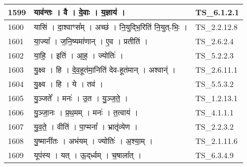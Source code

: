 \documentclass[17pt]{extarticle}
\begin{document}
\begin{longtable}{||p{0.4in}||p{4.9in}||p{0.9in}||}
    \hline
        
    1599 & याव॑न्तः   ।   वै   ।   दे॒वाः   ।   य॒ज्ञाय॑   ।    & TS\_6.1.2.1       \\
    
    \hline
        
    1600 & यासि॑   ।   दा॒श्वाꣳस᳚म्   ।   अच्छ॑   ।   नि॒युद्भि॒रिति॑ नि॒युत्{-}भिः॒   ।    & TS\_2.2.12.8       \\
    
    \hline
        
    1601 & या॒ज्या᳚   ।   ज॒नि॒ष्यमा॑णान्   ।   ए॒व   ।   प्रतीति॑   ।    & TS\_2.6.2.4       \\
    
    \hline
        
    1602 & या॒हि॒   ।   इति॑   ।   आ॒ह॒   ।   ज्योतिः॑   ।    & TS\_5.2.2.3       \\
    
    \hline
        
    1603 & यु॒क्ष्व   ।   हि   ।   दे॒व॒हूत॑मा॒निति॑ देव{-}हूत॑मान्   ।   अश्वान्॑   ।    & TS\_2.6.11.1       \\
    
    \hline
        
    1604 & यु॒क्ष्व   ।   हि   ।   ये   ।   तव॑   ।    & TS\_5.5.3.2       \\
    
    \hline
        
    1605 & यु॒ञ्जते᳚   ।   मनः॑   ।   उ॒त   ।   यु॒ञ्ज॒ते॒   ।    & TS\_1.2.13.1       \\
    
    \hline
        
    1606 & यु॒ञ्जा॒नः   ।   प्र॒थ॒मम्   ।   मनः॑   ।   त॒त्वाय॑   ।    & TS\_4.1.1.1       \\
    
    \hline
        
    1607 & यु॒व॒ते॒   ।   वीति॑   ।   पा॒प्मना᳚   ।   भ्रातृ॑व्येण   ।    & TS\_2.2.3.2       \\
    
    \hline
        
    1608 & यु॒ष्मानी॑तः   ।   अभ॑यम्   ।   ज्योतिः॑   ।   अ॒श्या॒म्   ।    & TS\_2.1.11.6       \\
    
    \hline
        
    1609 & यूप॑स्य   ।   यत्   ।   ऊ॒द्‌र्ध्वम्   ।   च॒षाला᳚त्   ।    & TS\_6.3.4.9       \\
    

\end{longtable}
\end{document}
